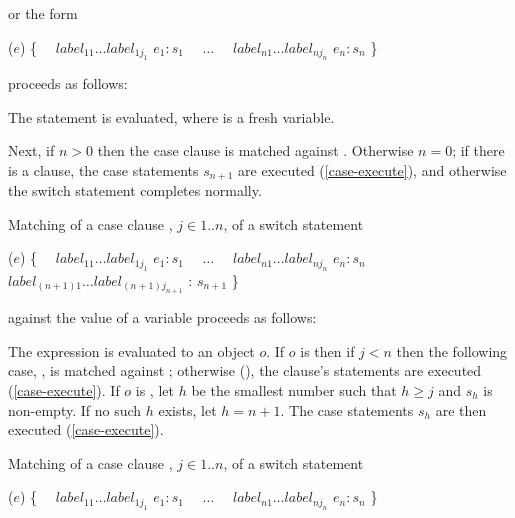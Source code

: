 \documentclass[makeidx]{article}
\begin{document}
{\noindent
or the form

\begin{normativeDartCode}
\SWITCH{} ($e$) \{
\ \ $label_{11} \ldots label_{1j_1}$ \CASE{} $e_1: s_1$
\ \ $\ldots$
\ \ $label_{n1} \ldots label_{nj_n}$ \CASE{} $e_n: s_n$
\}
\end{normativeDartCode}

\noindent
proceeds as follows:

\LMHash{}%
The statement  is evaluated,
where \id{} is a fresh variable.

\LMHash{}%
Next, if $n > 0$ then the case clause
is matched against \id.
Otherwise $n = 0$;
if there is a \DEFAULT{} clause,
the case statements $s_{n+1}$ are executed (\ref{case-execute}),
and otherwise the switch statement completes normally.

\LMHash{}%
Matching of a case clause ,
$j \in 1 .. n$,
of a switch statement

\begin{normativeDartCode}
\SWITCH{} ($e$) \{
\ \ $label_{11} \ldots label_{1j_1}$ \CASE{} $e_1: s_1$
\ \ $\ldots$
\ \ $label_{n1} \ldots label_{nj_n}$ \CASE{} $e_n: s_n$
\ \ $label_{(n+1)1} \ldots label_{(n+1)j_{n+1}}$ \DEFAULT{}: $s_{n+1}$
\}
\end{normativeDartCode}

\noindent
against the value of a variable \id{} proceeds as follows:

\LMHash{}%
The expression  is evaluated to an object $o$.
If $o$ is \FALSE{} then if $j < n$ then the following case,
, is matched against \id{};
otherwise (),
the \DEFAULT{} clause's statements are executed
(\ref{case-execute}).
If $o$ is \TRUE, let $h$ be the smallest number
such that $h \ge j$ and $s_h$ is non-empty.
If no such $h$ exists, let $h = n + 1$.
The case statements $s_h$ are then executed
(\ref{case-execute}).

\LMHash{}%
Matching of a case clause ,
$j \in 1 .. n$,
of a switch statement

\begin{normativeDartCode}
\SWITCH{} ($e$) \{
\ \ $label_{11} \ldots label_{1j_1}$ \CASE{} $e_1: s_1$
\ \ $\ldots$
\ \ $label_{n1} \ldots label_{nj_n}$ \CASE{} $e_n: s_n$
\}
\end{normativeDartCode}

}
\end{document}
